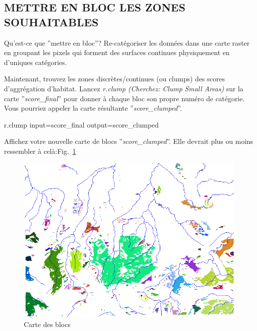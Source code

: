 \subsection{METTRE EN BLOC LES ZONES SOUHAITABLES}

Qu'est-ce que ''mettre en bloc''?
Re-cat\'egoriser les donn\'ees dans une carte raster en groupant les pixels qui forment des surfaces continues physiquement en d'uniques cat\'egories.

Maintenant, trouvez les zones discr\`etes/continues (ou clumps) des scores d'aggr\'egation d'habitat. 
Lancez \textit{r.clump (Cherchez: Clump Small Areas) }sur la carte ''\textit{score\_final}'' pour donner \`a chaque bloc son propre num\'ero de cat\'egorie. Vous pourriez appeler la carte r\'esultante ''\textit{score\_clumped}''.

\begin{smallverbatim}
r.clump input=score_final output=score_clumped 
\end{smallverbatim}

Affichez votre nouvelle carte de blocs ''\textit{score\_clumped}''. Elle devrait plus ou moins ressembler \`a cel\`a:Fig.~\ref{fig:grass022}

\begin{figure}[htbp]
   \centering
   \includegraphics[scale=0.35]{grass022.png}
   \caption{Carte des blocs}
   \label{fig:grass022}
\end{figure}


